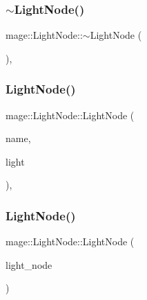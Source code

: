 \subsubsection{\texorpdfstring{$\sim$\+Light\+Node()}{~LightNode()}}
{\footnotesize\ttfamily mage\+::\+Light\+Node\+::$\sim$\+Light\+Node (\begin{DoxyParamCaption}{ }\end{DoxyParamCaption})\hspace{0.3cm}{\ttfamily [virtual]}, {\ttfamily [default]}}

\hypertarget{classmage_1_1_light_node_a4fea7bde70aebb6f9dc30e3374507c8a}{}\label{classmage_1_1_light_node_a4fea7bde70aebb6f9dc30e3374507c8a} 
\subsubsection{\texorpdfstring{Light\+Node()}{LightNode()}\hspace{0.1cm}{\footnotesize\ttfamily [1/3]}}
{\footnotesize\ttfamily mage\+::\+Light\+Node\+::\+Light\+Node (\begin{DoxyParamCaption}\item[{const string \&}]{name,  }\item[{\hyperlink{namespacemage_a8c307fbcc33bce9b7f2aa4c26c3b95cf}{Unique\+Ptr}$<$ \hyperlink{classmage_1_1_light}{Light} $>$ \&\&}]{light }\end{DoxyParamCaption})\hspace{0.3cm}{\ttfamily [explicit]}, {\ttfamily [protected]}}

\hypertarget{classmage_1_1_light_node_afc1174329e2dbf2d349303fc396c3760}{}\label{classmage_1_1_light_node_afc1174329e2dbf2d349303fc396c3760} 
\subsubsection{\texorpdfstring{Light\+Node()}{LightNode()}\hspace{0.1cm}{\footnotesize\ttfamily [2/3]}}
{\footnotesize\ttfamily mage\+::\+Light\+Node\+::\+Light\+Node (\begin{DoxyParamCaption}\item[{const \hyperlink{classmage_1_1_light_node}{Light\+Node} \&}]{light\+\_\+node }\end{DoxyParamCaption})\hspace{0.3cm}{\ttfamily [protected]}}

